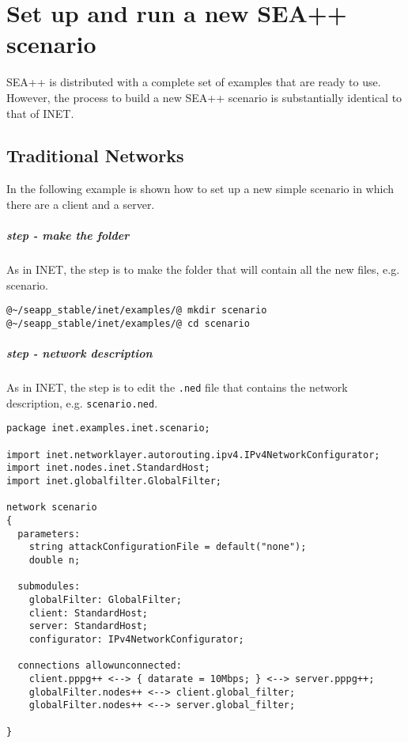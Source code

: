 

\chapter{Set up and run a new SEA++ scenario}
\label{ch:run-scenario}

SEA++ is distributed with a complete set of examples that are ready to use. However, the process to build a new SEA++ scenario is substantially identical to that of INET.

\section{Traditional Networks}

In the following example is shown how to set up a new simple scenario in which there are a client and a server.

\paragraph{ step - make the folder}
As in INET, the  step is to make the folder that will contain all the new files, e.g. scenario.
%
\begin{lstlisting}[language={terminal}]
@~/seapp_stable/inet/examples/@ mkdir scenario
@~/seapp_stable/inet/examples/@ cd scenario
\end{lstlisting}


\paragraph{ step - network description}
As in INET, the  step is to edit the \texttt{.ned} file that contains the network description, e.g. \texttt{scenario.ned}.
%
\begin{lstlisting}[language={ned}, caption={scenario.ned}, label={lst:build-scenario-ned}]
package inet.examples.inet.scenario;

import inet.networklayer.autorouting.ipv4.IPv4NetworkConfigurator;
import inet.nodes.inet.StandardHost;
import inet.globalfilter.GlobalFilter;

network scenario
{
  parameters:
    string attackConfigurationFile = default("none");
    double n;

  submodules:
    globalFilter: GlobalFilter;
    client: StandardHost;
    server: StandardHost;
    configurator: IPv4NetworkConfigurator;
        
  connections allowunconnected:
    client.pppg++ <--> { datarate = 10Mbps; } <--> server.pppg++;
    globalFilter.nodes++ <--> client.global_filter;
    globalFilter.nodes++ <--> server.global_filter;
    
}
\end{lstlisting}

